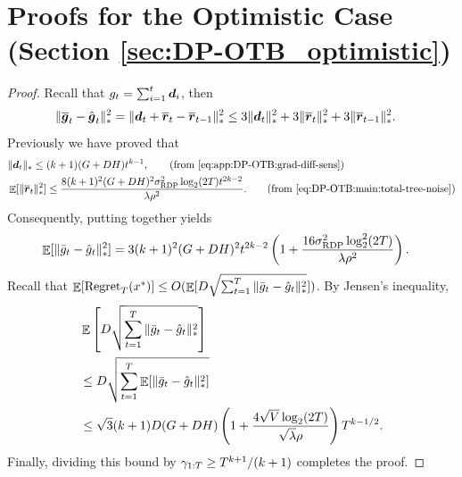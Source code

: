 \section{Proofs for the Optimistic Case (Section \ref{sec:DP-OTB_optimistic})}
\label{app:DP-OTB:optimistic}

\ThmDpotbOptimistic*

\begin{proof}
Recall that $g_t=\sum_{i=1}^t {\boldsymbol{d}}_i$, then
\begin{align*}
    \|\overline {{\boldsymbol{g}}}_t - \hat {{\boldsymbol{g}}}_t\|_*^2
    &= \|{\boldsymbol{d}}_t + \overline{{\boldsymbol{r}}}_t - \overline{{\boldsymbol{r}}}_{t-1}\|_*^2
    \leq 3\|{\boldsymbol{d}}_t\|_*^2 + 3\|\overline{{\boldsymbol{r}}}_t\|_*^2 + 3\|\overline{{\boldsymbol{r}}}_{t-1}\|_*^2.
\end{align*}
Previously we have proved that
\begin{align}
    &\|\vecd_t\|_\ast \le (k+1)(G+DH)t^{k-1}, \tag{from \eqref{eq:app:DP-OTB:grad-diff-sens}} \\
    &\E[\|\overline\vecr_t\|_\ast^2] \le \frac{8(k+1)^2(G+DH)^2\RDPdist^2\log_2(2T)t^{2k-2}}{\lambda\rho^2}. \tag{from \eqref{eq:DP-OTB:main:total-tree-noise}}
\end{align}
Consequently, putting together yields
\begin{align*}
    \mathop{\mathbb{E}}[\|\bar{g}_t-\hat{g}_t\|_*^2]
    &= 3(k+1)^2(G+DH)^2t^{2k-2}\left(1+\frac{16\sigma_{\mathrm{RDP}}^2\log_2^2(2T)}{\lambda\rho^2}\right).
\end{align*}
Recall that $\mathop{\mathbb{E}}[\mathrm{Regret}_T(x^*)] \leq O(\mathop{\mathbb{E}}[D\sqrt{\sum_{t=1}^T\|\bar g_t-\hat g_t\|_*^2}])$. By Jensen's inequality,
\begin{align*}
    &\mathop{\mathbb{E}}\left[D\sqrt{\sum_{t=1}^T\|\Bar{g}_{t}-\hat{g}_t\|_*^2}\right] \\ 
    &\leq D\sqrt{\sum_{t=1}^T \mathop{\mathbb{E}}[\|\Bar{g}_t-\hat{g}_t\|_*^2]} \\
    &\leq \sqrt{3}(k+1)D(G+DH)\left(1+\frac{4\sqrt{V}\log_2(2T)}{\sqrt{\lambda}\rho}\right)T^{k-1/2}.
\end{align*}
Finally, dividing this bound by $\gamma_{1:T}\geq T^{k+1}/(k+1)$ completes the proof.
\end{proof}
